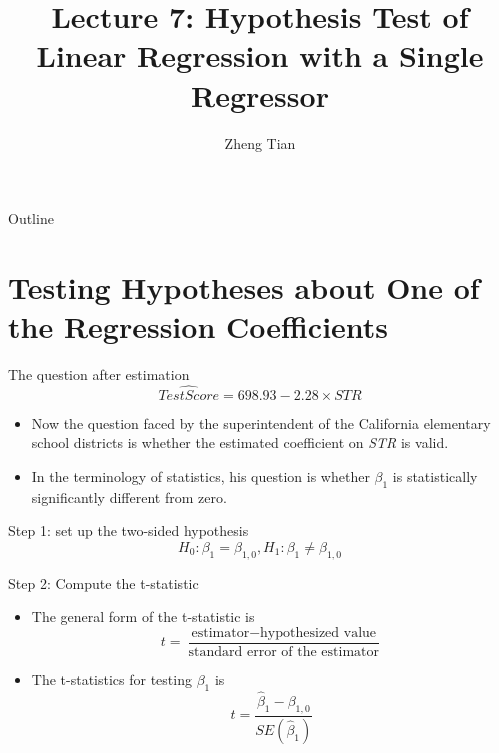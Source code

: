 \documentclass[presentation]{beamer}
\author{Zheng Tian}
\date{}
\title{Lecture 7: Hypothesis Test  of Linear Regression with a Single Regressor}
\begin{document}
\maketitle
\begin{frame}{Outline}
\setcounter{tocdepth}{1}
\tableofcontents
\end{frame}



\section{Testing Hypotheses about One of the Regression Coefficients}
\label{sec:orgdcd2f82}

\begin{frame}[label={sec:org1d89d22}]{The question after estimation}
\begin{equation}
\label{eq:testscr-str-1e}
\widehat{TestScore} = 698.93 - 2.28 \times STR
\end{equation}

\begin{itemize}
\item Now the question faced by the superintendent of the California
elementary school districts is whether the estimated coefficient on
\emph{STR} is valid.

\item In the terminology of statistics, his question is
whether \(\beta_1\) is statistically significantly different from
zero.
\end{itemize}
\end{frame}

\begin{frame}[label={sec:orgb37ff80}]{Step 1: set up the two-sided hypothesis}
\[ H_0: \beta_1 = \beta_{1,0}, H_1: \beta_1 \neq \beta_{1,0} \]
\end{frame}

\begin{frame}[label={sec:orgead7e54}]{Step 2: Compute the t-statistic}
\begin{itemize}
\item The general form of the t-statistic is
\begin{equation}
\label{eq:general-t}
t = \frac{\text{estimator} - \text{hypothesized value}}{\text{standard error of the estimator}}
\end{equation}

\item The t-statistics for testing \(\beta_1\) is
\begin{equation}
\label{eq:t-stat-b1}
t = \frac{\hat{\beta}_1 - \beta_{1,0}}{SE(\hat{\beta}_1)}
\end{equation}
\end{itemize}
\end{frame}
\end{document}
